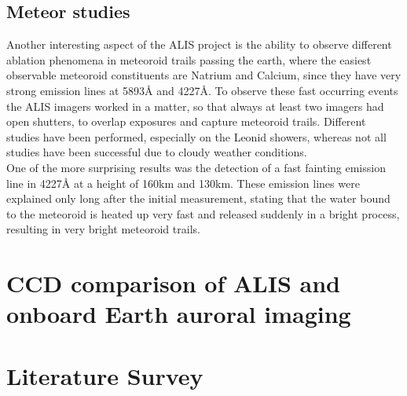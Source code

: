 \subsection{Meteor studies}
Another interesting aspect of the ALIS project is the ability to observe different ablation phenomena in meteoroid trails passing the earth, where the easiest observable meteoroid constituents are Natrium and Calcium, since they have very strong emission lines at 5893Å and 4227Å. To observe these fast occurring events the ALIS imagers worked in a matter, so that always at least two imagers had open shutters, to overlap exposures and capture meteoroid trails.
Different studies have been performed, especially on the Leonid showers, whereas not all studies have been successful due to cloudy weather conditions.\\
One of the more surprising results was the detection of a fast fainting emission line in 4227Å at a height of 160km and 130km. These emission lines were explained only long after the initial measurement, stating that the water bound to the meteoroid is heated up very fast and released suddenly in a bright process, resulting in very bright meteoroid trails.

\section{CCD comparison of ALIS and onboard Earth auroral imaging}


\section{Literature Survey}




